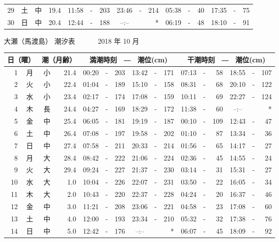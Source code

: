 \documentclass[12pt.a4j]{jsarticle}
\begin{document}
\begin{center}
\begin{table}[ht]
\begin{tabular}{|rc|cr|ccrccr|ccrccr|}
29 & 土 & 中 & 19.4 & 11:58 &-& 203 & 23:46 &-& 214 & 05:38 &-&  40 & 17:35 &-&  75 \\
30 & 日 & 中 & 20.4 & 12:44 &-& 188 & --:-- & &  *  & 06:19 &-&  48 & 18:10 &-&  91 \\
\hline
\end{tabular}
\end{table}
\newpage
{\LARGE 大瀬（馬渡島）  潮汐表　　　}
{\large 2018 年 10 月}\\
\begin{table}[ht]
\begin{tabular}{|rc|cr|ccrccr|ccrccr|}
\hline
\multicolumn{2}{|c|}{日（曜）} & \multicolumn{2}{c|}{潮（月齢）} & \multicolumn{6}{c|}{満潮時刻　―　潮位(cm)} & \multicolumn{6}{c|}{干潮時刻　―　潮位(cm)} \\
\hline
 1 & 月 & 小 & 21.4 & 00:20 &-& 203 & 13:42 &-& 171 & 07:13 &-&  58 & 18:55 &-& 107 \\
 2 & 火 & 小 & 22.4 & 01:04 &-& 189 & 15:10 &-& 158 & 08:31 &-&  68 & 20:10 &-& 122 \\
 3 & 水 & 小 & 23.4 & 02:17 &-& 174 & 17:08 &-& 159 & 10:11 &-&  69 & 22:27 &-& 124 \\
 4 & 木 & 長 & 24.4 & 04:27 &-& 169 & 18:29 &-& 172 & 11:38 &-&  60 & --:-- & &  *  \\
 5 & 金 & 中 & 25.4 & 06:05 &-& 181 & 19:19 &-& 187 & 00:10 &-& 109 & 12:43 &-&  47 \\
 6 & 土 & 中 & 26.4 & 07:08 &-& 197 & 19:58 &-& 202 & 01:10 &-&  87 & 13:34 &-&  36 \\
 7 & 日 & 中 & 27.4 & 07:58 &-& 211 & 20:33 &-& 214 & 01:56 &-&  65 & 14:17 &-&  27 \\
 8 & 月 & 大 & 28.4 & 08:42 &-& 222 & 21:06 &-& 224 & 02:36 &-&  45 & 14:55 &-&  24 \\
 9 & 火 & 大 & 29.4 & 09:24 &-& 227 & 21:37 &-& 230 & 03:14 &-&  31 & 15:31 &-&  27 \\
10 & 水 & 大 &  1.0 & 10:04 &-& 226 & 22:07 &-& 231 & 03:50 &-&  22 & 16:05 &-&  34 \\
11 & 木 & 大 &  2.0 & 10:43 &-& 220 & 22:37 &-& 228 & 04:24 &-&  20 & 16:37 &-&  46 \\
12 & 金 & 中 &  3.0 & 11:21 &-& 208 & 23:06 &-& 221 & 04:58 &-&  23 & 17:08 &-&  60 \\
13 & 土 & 中 &  4.0 & 12:00 &-& 193 & 23:34 &-& 210 & 05:32 &-&  32 & 17:38 &-&  76 \\
14 & 日 & 中 &  5.0 & 12:42 &-& 176 & --:-- & &  *  & 06:07 &-&  45 & 18:09 &-&  92 \\

\end{tabular}
\end{table}
\end{center}
\end{document}
